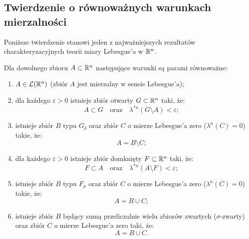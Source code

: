 \subsection{Twierdzenie o równoważnych warunkach mierzalności}

Poniższe twierdzenie stanowi jeden z najważniejszych rezultatów charakteryzacyjnych teorii miary Lebesgue'a w $\mathbb{R}^{n}$.

\begin{tw}\label{tw:charakter_mierzalnosci}
    Dla dowolnego zbioru $A \subset \mathbb{R}^{n}$ następujące warunki są parami równoważne:
    \begin{enumerate}
        \item[(1)] $A \in \mathcal{L}({\mathbb{R}^{n}})$ (zbiór $A$ jest mierzalny w sensie Lebesgue'a);
        \item[(2)] dla każdego $\varepsilon > 0$ istnieje zbiór otwarty $G \subset \mathbb{R}^{n}$ taki, że:
              \begin{equation*}
                  A \subset G \quad \text{oraz} \quad \lambda^{*n}(G \setminus A) < \varepsilon;
              \end{equation*}
        \item[(3)] istnieje zbiór $B$ typu $G_\delta$ oraz zbiór $C$ o mierze Lebesgue'a zero ($\lambda^n(C) = 0$) takie, że:
              \begin{equation*}
                  A = B \setminus C;
              \end{equation*}
        \item[(4)] dla każdego $\varepsilon > 0$ istnieje zbiór domknięty $F \subset \mathbb{R}^{n}$ taki, że:
              \begin{equation*}
                  F \subset A \quad \text{oraz} \quad \lambda^{*n}(A \setminus F) < \varepsilon;
              \end{equation*}
        \item[(5)] istnieje zbiór $B$ typu $F_\sigma$ oraz zbiór $C$ o mierze Lebesgue'a zero ($\lambda^n(C) = 0$) takie, że:
              \begin{equation*}
                  A = B \cup C;
              \end{equation*}
        \item[(6)] istnieje zbiór $B$ będący sumą przeliczalnie wielu zbiorów zwartych ($\sigma$-zwarty) oraz zbiór $C$ o mierze Lebesgue'a zero taki, że:
              \begin{equation*}
                  A = B \cup C.
              \end{equation*}
    \end{enumerate}
\end{tw}

